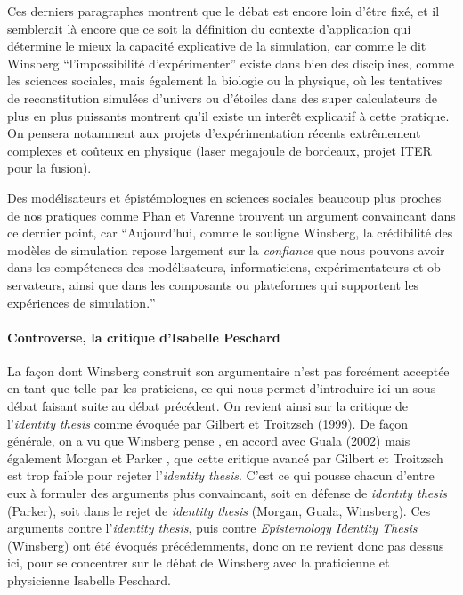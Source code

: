 Ces derniers paragraphes montrent que le débat est encore loin d'être fixé, et il semblerait là encore que ce soit la définition du contexte d'application qui détermine le mieux la capacité explicative de la simulation, car comme le dit Winsberg \enquote{l'impossibilité d'expérimenter} existe dans bien des disciplines, comme les sciences sociales, mais également la biologie ou la physique, où les tentatives de reconstitution simulées d'univers ou d'étoiles dans des super calculateurs de plus en plus puissants montrent qu'il existe un interêt explicatif à cette pratique. On pensera notamment aux projets d'expérimentation récents extrêmement complexes et coûteux en physique (laser megajoule de bordeaux, projet ITER pour la fusion).

Des modélisateurs et épistémologues en sciences sociales beaucoup plus proches de nos pratiques comme Phan et Varenne trouvent un argument convaincant dans ce dernier point, car \foreignquote{english}{Aujourd'hui, comme le souligne Winsberg, la crédibilité des modèles de simulation repose largement sur la \textit{confiance} que nous pouvons avoir dans les compétences des modélisateurs, informaticiens, expérimentateurs et observateurs, ainsi que dans les composants ou plateformes qui supportent les expériences de simulation.} \autocite{Phan2008}

\paragraph{Controverse, la critique d'Isabelle Peschard}

La façon dont Winsberg construit son argumentaire n'est pas forcément acceptée en tant que telle par les praticiens, ce qui nous permet d'introduire ici un sous-débat faisant suite au débat précédent. On revient ainsi sur la critique de l'\textit{identity thesis} comme évoquée par Gilbert et Troitzsch (1999). De façon générale, on a vu que Winsberg pense , en accord avec Guala (2002) \autocite{Winsberg2009} mais également Morgan  et Parker \autocite{Winsberg2013}, que cette critique avancé par Gilbert et Troitzsch est trop faible pour rejeter l'\textit{identity thesis}. C'est ce qui pousse chacun d'entre eux à formuler des arguments plus convaincant, soit en défense de \textit{identity thesis} (Parker), soit dans le rejet de \textit{identity thesis} (Morgan, Guala, Winsberg). Ces arguments contre l'\textit{identity thesis}, puis contre \textit{Epistemology Identity Thesis} (Winsberg) ont été évoqués précédemments, donc on ne revient donc pas dessus ici, pour se concentrer sur le débat de Winsberg avec la praticienne et physicienne Isabelle Peschard.

